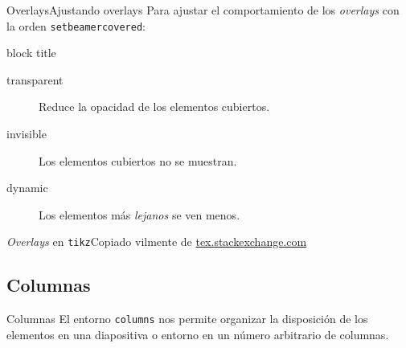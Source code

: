 \begin{frame}{Overlays}{Ajustando overlays}
  Para ajustar el comportamiento de los \textit{overlays} con la orden \texttt{setbeamercovered}:
  \espacio

  \begin{beamercolorbox}[rounded=true]{block title}
    \begin{description}
      \item[transparent] Reduce la opacidad de los elementos cubiertos.
      \item[invisible]   Los elementos cubiertos no se muestran.
      \item[dynamic]     Los elementos más \textit{lejanos} se ven menos.
    \end{description}
  \end{beamercolorbox}
\end{frame}

\begin{frame}{\textit{Overlays} en \texttt{tikz}}{Copiado vilmente de %
\href{http://tex.stackexchange.com/questions/55806}{tex.stackexchange.com}}
  \begin{center}
  \end{center}
\end{frame}

\subsection{Columnas}

\begin{frame}{Columnas}
  El entorno \texttt{columns} nos permite organizar la disposición de los
  elementos en una diapositiva o entorno en un número arbitrario de columnas.
  \espacio
  \begin{overlayarea}{\textwidth}{5cm}
  \end{overlayarea}
\end{frame}
